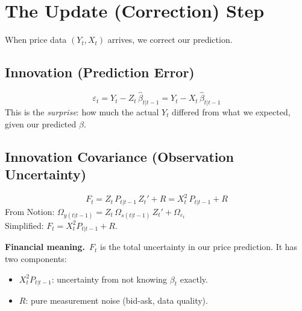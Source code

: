\documentclass[10pt,a4paper,twocolumn]{article}
\begin{document}
\section{The Update (Correction) Step}

When price data $(Y_t, X_t)$ arrives, we correct our prediction.

\subsection{Innovation (Prediction Error)}

\begin{tcolorbox}[mathbox={Formula 3 --- Innovation $\varepsilon_t$}]
\vspace{-4pt}
\begin{equation}
  \varepsilon_t = Y_t - Z_t\,\hat\beta_{t|t-1} = Y_t - X_t\,\hat\beta_{t|t-1}
  \label{eq:innovation}
\end{equation}
\vspace{-4pt}
This is the \emph{surprise}: how much the actual $Y_t$ differed from
what we expected, given our predicted $\beta$.
\end{tcolorbox}

\subsection{Innovation Covariance (Observation Uncertainty)}

\begin{tcolorbox}[mathbox={Formula 4 --- Innovation Variance $F_t$}]
\vspace{-4pt}
\begin{equation}
  F_t = Z_t\,P_{t|t-1}\,Z_t' + R = X_t^2\,P_{t|t-1} + R
  \label{eq:innov_var}
\end{equation}
\vspace{-4pt}
From Notion: $\Omega_{y(t|t-1)} = Z_t\,\Omega_{s(t|t-1)}\,Z_t' + \Omega_{\varepsilon_t}$\\
Simplified: $F_t = X_t^2 P_{t|t-1} + R$.
\end{tcolorbox}

\noindent\textbf{Financial meaning.}~$F_t$ is the total uncertainty in
our price prediction.  It has two components:
\begin{itemize}\setlength\itemsep{0pt}
  \item $X_t^2 P_{t|t-1}$: uncertainty from not knowing $\beta_t$ exactly.
  \item $R$: pure measurement noise (bid-ask, data quality).
\end{itemize}
\end{document}
